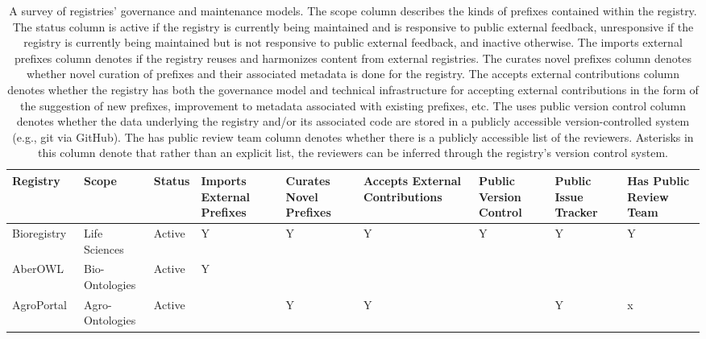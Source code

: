 \begin{table}
\centering
\caption{A survey of registries' governance and maintenance models. The scope column describes the kinds of prefixes contained within the registry. The status column is active if the registry is currently being maintained and is responsive to public external feedback, unresponsive if the registry is currently being maintained but is not responsive to public external feedback, and inactive otherwise. The imports external prefixes column denotes if the registry reuses and harmonizes content from external registries. The curates novel prefixes column denotes whether novel curation of prefixes and their associated metadata is done for the registry. The accepts external contributions column denotes whether the registry has both the governance model and technical infrastructure for accepting external contributions in the form of the suggestion of new prefixes, improvement to metadata associated with existing prefixes, etc. The uses public version control column denotes whether the data underlying the registry and/or its associated code are stored in a publicly accessible version-controlled system (e.g., git via GitHub). The has public review team column denotes whether there is a publicly accessible list of the reviewers. Asterisks in this column denote that rather than an explicit list, the reviewers can be inferred through the registry's version control system.}
\label{tab:registry-comparison-governance}
\begin{tabular}{lllllllll}
\toprule
                               Registry &           Scope &       Status & Imports External Prefixes & Curates Novel Prefixes & Accepts External Contributions & Public Version Control & Public Issue Tracker & Has Public Review Team \\
\midrule
            Bioregistry~\cite{Hoyt2022} &   Life Sciences &       Active &                         Y &                      Y &                              Y &                      Y &                    Y &                      Y \\
           AberOWL~\cite{Hoehndorf2015} &  Bio-Ontologies &       Active &                         Y &                        &                                &                        &                      &                        \\
          AgroPortal~\cite{Jonquet2018} & Agro-Ontologies &       Active &                           &                      Y &                              Y &                        &                    Y &                      x \\

\end{tabular}
\end{table}
